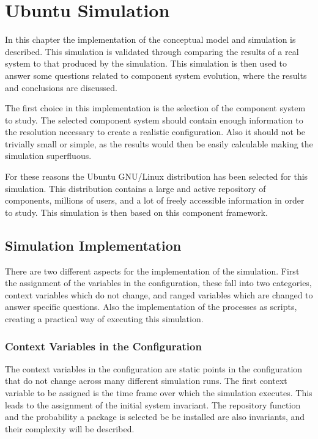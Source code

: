 
\chapter{Ubuntu Simulation}
\label{ubunutsimulation}
{}In this chapter the implementation of the conceptual model and simulation is described.
{}This simulation is validated through comparing the results of a real system to that produced by the simulation. 
{}This simulation is then used to answer some questions related to component system evolution, where the results and conclusions are discussed.

The first choice in this implementation is the selection of the component system to study.
The selected component system should contain enough information to the resolution necessary to create a realistic configuration.
Also it should not be trivially small or simple, as the results would then be easily calculable making the simulation superfluous.

For these reasons the Ubuntu GNU/Linux distribution has been selected for this simulation.
This distribution contains a large and active repository of components, millions of users, and a lot of freely accessible information in order to study.
This simulation is then based on this component framework.

\section{Simulation Implementation}
There are two different aspects for the implementation of the simulation.
First the assignment of the variables in the configuration, these fall into two categories, context variables which do not change, 
and ranged variables which are changed to answer specific questions.
Also the implementation of the processes as scripts, creating a practical way of executing this simulation.

\subsection{Context Variables in the Configuration}
The context variables in the configuration are static points in the configuration that do not change across many different simulation runs.
The first context variable to be assigned is the time frame over which the simulation executes.
This leads to the assignment of the initial system invariant.
The repository function and the probability a package is selected be be installed are also invariants, and their complexity will be described.

